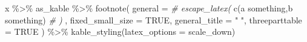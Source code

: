 \documentclass[
]{article}
\newenvironment{Shaded}{\begin{snugshade}}{\end{snugshade}}
\newcommand{\AttributeTok}[1]{\textcolor[rgb]{0.77,0.63,0.00}{#1}}
\newcommand{\CommentTok}[1]{\textcolor[rgb]{0.56,0.35,0.01}{\textit{#1}}}
\newcommand{\ConstantTok}[1]{\textcolor[rgb]{0.00,0.00,0.00}{#1}}
\newcommand{\FunctionTok}[1]{\textcolor[rgb]{0.00,0.00,0.00}{#1}}
\newcommand{\NormalTok}[1]{#1}
\newcommand{\SpecialCharTok}[1]{\textcolor[rgb]{0.00,0.00,0.00}{#1}}
\newcommand{\StringTok}[1]{\textcolor[rgb]{0.31,0.60,0.02}{#1}}
\begin{document}
\begin{Shaded}
\begin{Highlighting}[]
\NormalTok{x }\SpecialCharTok{\%\textgreater{}\%}
\NormalTok{  as\_kable }\SpecialCharTok{\%\textgreater{}\%}
  \FunctionTok{footnote}\NormalTok{(}
    \AttributeTok{general =} \CommentTok{\# escape\_latex(}
      \FunctionTok{c}\NormalTok{(}\StringTok{\textquotesingle{}a something\textquotesingle{}}\NormalTok{,}\StringTok{\textquotesingle{}b something\textquotesingle{}}\NormalTok{)}
      \CommentTok{\# )}
\NormalTok{    ,}
    \AttributeTok{fixed\_small\_size =} \ConstantTok{TRUE}\NormalTok{,}
    \AttributeTok{general\_title =} \StringTok{" "}\NormalTok{,}
    \AttributeTok{threeparttable =} \ConstantTok{TRUE}
\NormalTok{  ) }\SpecialCharTok{\%\textgreater{}\%}
  \FunctionTok{kable\_styling}\NormalTok{(}\AttributeTok{latex\_options =} \StringTok{\textquotesingle{}scale\_down\textquotesingle{}}\NormalTok{)}
\end{Highlighting}
\end{Shaded}
\end{document}
